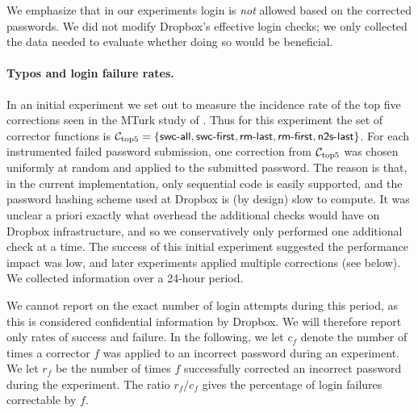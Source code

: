 We emphasize that in our experiments login is \emph{not} allowed based on the
corrected passwords. We did not modify Dropbox's effective login checks; we
only collected the data needed to evaluate whether doing so would be
beneficial.


\paragraph{Typos and login failure rates.} In an initial experiment we
set out to measure the incidence rate of the top five corrections seen
in the MTurk study of . Thus for this
experiment the set of corrector functions is
${\mathcal C}_{\textrm{top5}} = \{\textsf{swc-all},\textsf{swc-first},\textsf{rm-last},\textsf{rm-first},\textsf{n2s-last}\}$.  For
each instrumented failed password submission, one correction from
${\mathcal C}_{\textrm{top5}}$ was chosen uniformly at random and applied to the submitted
password.  The reason is that, in the current implementation, only
sequential code is easily supported, and the password hashing scheme
used at Dropbox is (by design) slow to compute. It was unclear a
priori exactly what overhead the additional checks would have on
Dropbox infrastructure, and so we conservatively only performed one
additional check at a time.
The success of this initial experiment suggested the performance impact was low,
and later experiments applied multiple corrections (see below).
We collected information over a 24-hour period.

We cannot report on the exact number of login attempts during this
period, as this is considered confidential information by Dropbox. We will
therefore report only rates of success and failure.
In the following, we let $c_f$ denote the number of times a corrector $f$ was
applied to an incorrect password during an experiment. We let $r_f$  be the
number of times $f$ successfully corrected an incorrect password during the
experiment. The ratio $r_f / c_f$ gives the percentage 
of login failures correctable by $f$.


